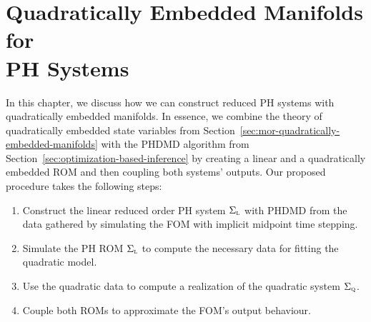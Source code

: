 \chapter[Quadratically Embedded Manifolds for \texorpdfstring{\acl{PH}}{PH} Systems]{%
    Quadratically Embedded Manifolds for \\
    \texorpdfstring{\acl{PH}}{PH} Systems%
}\label{chap:quadratically-embedded-manifolds-ph-systems}

In this chapter, we discuss how we can construct reduced \ac{PH} systems with quadratically embedded manifolds.
In essence, we combine the theory of quadratically embedded state variables from Section~\ref{sec:mor-quadratically-embedded-manifolds} with the \ac{PHDMD} algorithm from Section~\ref{sec:optimization-based-inference} by creating a linear and a quadratically embedded \ac{ROM} and then coupling both systems' outputs.
Our proposed procedure takes the following steps:
\begin{enumerate}
    \item Construct the linear reduced order \ac{PH} system $\Sigma_{\textnormal{\scshape l}}$ with \ac{PHDMD} from the data gathered by simulating the \ac{FOM} with implicit midpoint time stepping.
    \item Simulate the \ac{PH} \ac{ROM} $\Sigma_{\textnormal{\scshape l}}$ to compute the necessary data for fitting the quadratic model.
    \item Use the quadratic data to compute a realization of the quadratic system $\Sigma_{\textnormal{\scshape q}}$.
    \item Couple both \acp{ROM} to approximate the \ac{FOM}'s output behaviour.
\end{enumerate}

